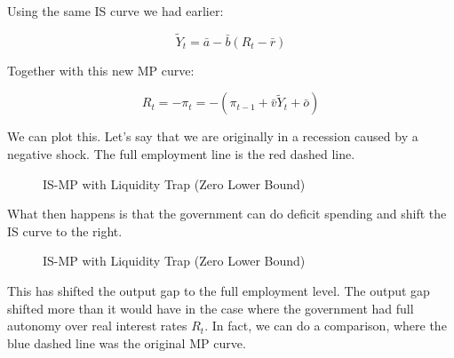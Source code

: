 \documentclass[11pt]{scrartcl}
\newcommand{\og}{\ensuremath{\tilde{Y}}}
\begin{document}
Using the same IS curve we had earlier:

\[\og_t = \bar{a} - \bar{b} (R_t -\bar{r}) \]

Together with this new MP curve:

\[ R_t = -\pi_t = -(\pi_{t-1} + \bar{v}\og_t + \bar{o}) \]

We can plot this. Let's say that we are originally in a recession caused by a negative shock. The full employment line is the \color{red}red dashed line\color{black}. 

\begin{figure}[H]
\centering
{}
\caption{IS-MP with Liquidity Trap (Zero Lower Bound)}
\end{figure}

What then happens is that the government can do deficit spending and shift the IS curve to the right. 

\begin{figure}[H]
\centering
{}
\caption{IS-MP with Liquidity Trap (Zero Lower Bound)}
\end{figure}

This has shifted the output gap to the full employment level. The output gap shifted more than it would have in the case where the government had full autonomy over real interest rates $R_t$. In fact, we can do a comparison, where the blue dashed line was the original MP curve.
\end{document}
